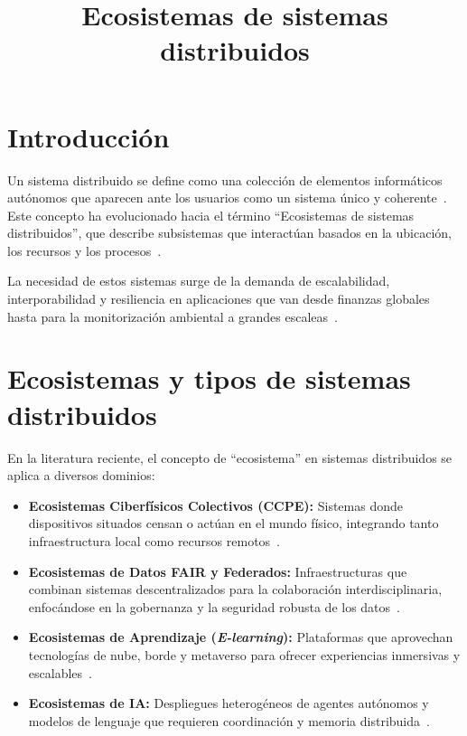 \documentclass[12pt,a4paper]{article}
\title{Ecosistemas de sistemas distribuidos}
\author{}
\date{}
\begin{document}
\maketitle

\section{Introducción}

Un sistema distribuido se define como una colección de elementos informáticos autónomos que aparecen ante los usuarios como un sistema único y coherente~\cite{r01}. Este concepto ha evolucionado hacia el término ``Ecosistemas de sistemas distribuidos'', que describe subsistemas que interactúan basados en la ubicación, los recursos y los procesos~\cite{r02}.

La necesidad de estos sistemas surge de la demanda de escalabilidad, interporabilidad y resiliencia en aplicaciones que van desde finanzas globales hasta para la monitorización ambiental a grandes escaleas~\cite{r03}.

\section{Ecosistemas y tipos de sistemas distribuidos}

En la literatura reciente, el concepto de ``ecosistema'' en sistemas distribuidos se aplica a diversos dominios:

\begin{itemize}
    \item \textbf{Ecosistemas Ciberfísicos Colectivos (CCPE):} Sistemas donde dispositivos situados censan o actúan en el mundo físico, integrando tanto infraestructura local como recursos remotos~\cite{r04}.

    \item \textbf{Ecosistemas de Datos FAIR y Federados:} Infraestructuras que combinan sistemas descentralizados para la colaboración interdisciplinaria, enfocándose en la gobernanza y la seguridad robusta de los datos~\cite{r05}.

    \item \textbf{Ecosistemas de Aprendizaje (\textit{E-learning}):} Plataformas que aprovechan tecnologías de nube, borde y metaverso para ofrecer experiencias inmersivas y escalables~\cite{r06}.

    \item \textbf{Ecosistemas de IA:} Despliegues heterogéneos de agentes autónomos y modelos de lenguaje que requieren coordinación y memoria distribuida~\cite{r07}.
\end{itemize}
\end{document}
